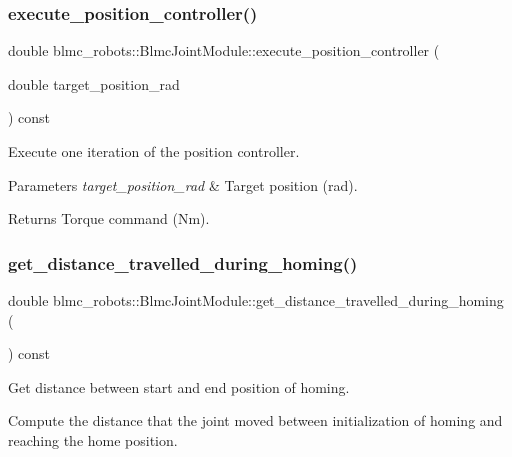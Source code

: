 \subsubsection{\texorpdfstring{execute\+\_\+position\+\_\+controller()}{execute\_position\_controller()}}
{\footnotesize\ttfamily double blmc\+\_\+robots\+::\+Blmc\+Joint\+Module\+::execute\+\_\+position\+\_\+controller (\begin{DoxyParamCaption}\item[{double}]{target\+\_\+position\+\_\+rad }\end{DoxyParamCaption}) const}



Execute one iteration of the position controller. 


\begin{DoxyParams}{Parameters}
{\em target\+\_\+position\+\_\+rad} & Target position (rad).\\
\hline
\end{DoxyParams}
\begin{DoxyReturn}{Returns}
Torque command (Nm). 
\end{DoxyReturn}
\mbox{\label{classblmc__robots_1_1BlmcJointModule_a9fd53d7e340b4067f3505633e5a8a06d}} 
\subsubsection{\texorpdfstring{get\+\_\+distance\+\_\+travelled\+\_\+during\+\_\+homing()}{get\_distance\_travelled\_during\_homing()}}
{\footnotesize\ttfamily double blmc\+\_\+robots\+::\+Blmc\+Joint\+Module\+::get\+\_\+distance\+\_\+travelled\+\_\+during\+\_\+homing (\begin{DoxyParamCaption}{ }\end{DoxyParamCaption}) const}



Get distance between start and end position of homing. 

Compute the distance that the joint moved between initialization of homing and reaching the home position.

